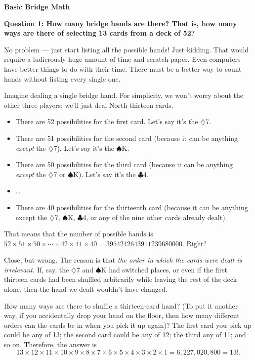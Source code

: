 \documentclass{amsart}
\numberwithin{equation}{section}
\newcommand{\x}{\times}
\newcommand{\C}{$\clubsuit$}
\newcommand{\D}{$\diamondsuit$}
\renewcommand{\H}{$\heartsuit$}
\renewcommand{\S}{$\spadesuit$}
\begin{document}
\thispagestyle{empty}

\textbf{\LARGE Basic Bridge Math}

\textbf{Question 1: How many bridge hands are there?  That is, how many 
ways are there of selecting 13 cards from a deck of 52?}

No problem --- just start listing all the possible hands!  Just kidding. 
That would require a ludicrously huge amount of time and scratch paper.  
Even computers have better things to do with their time. There must be a 
better way to count hands without listing every single one.

Imagine dealing a single bridge hand.  For simplicity, we won't worry 
about the other three players; we'll just deal North thirteen cards.

\begin{itemize}
\item There are 52 possibilities for the first card.  Let's say it's the \D7.
\item There are 51 possibilities for the second card (because it can be anything \emph{except} the \D7).
Let's say it's the \S K.
\item There are 50 possibilities for the third card (because it can be anything \emph{except} the \D7 or \S K).
Let's say it's the \C4.
\item \dots
\item There are 40 possibilities for the thirteenth card (because it can be anything except the \D7, \S K, \C4, or any of the
nine other cards already dealt).%
\end{itemize}

That means that the number of possible hands is $52\x51\x50\x\cdots\x42\x41\x40 = 3954242643911239680000$.
Right?

Close, but wrong.  The reason is that \emph{the order in which the cards 
were dealt is irrelevant.}  If, say, the \D7 and \S K had switched 
places, or even if the first thirteen cards had been shuffled 
arbitrarily while leaving the rest of the deck alone, then the hand we 
dealt wouldn't have changed.

How many ways are there to shuffle a thirteen-card hand?  (To put it 
another way, if you accidentally drop your hand on the floor, then how 
many different orders can the cards be in when you pick it up again)?
The first card you pick up could be any of 13; the second card could be 
any of 12; the third any of 11; and so on.  Therefore, the answer is
  $$13\x12\x11\x10\x9\x8\x7\x6\x5\x4\x3\x2\x1 = 6,227,020,800 = 13!.$$
\end{document}
